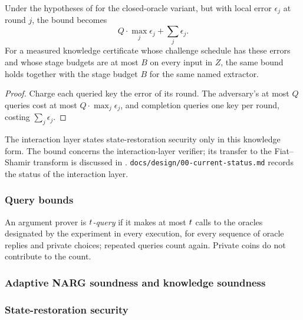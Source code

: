 \begin{theorem}
    \label{thm:sr_knowledge_soundness_nonuniform}
    Under the hypotheses of  for the closed-oracle variant, but
    with local error \(\epsilon_j\) at round \(j\), the bound becomes
    \begin{equation*}
        Q \cdot \max_j \epsilon_j + \sum_{j} \epsilon_j .
    \end{equation*}
    For a measured knowledge certificate whose challenge schedule has these errors and whose stage
    budgets are at most \(B\) on every input in \(Z\), the same bound holds together with the stage
    budget \(B\) for the same named extractor.
    \leanok
\end{theorem}
\begin{proof}
    \leanok
    Charge each queried key the error of its round. The adversary's at most \(Q\) queries cost at
    most \(Q \cdot \max_j \epsilon_j\), and completion queries one key per round, costing
    \(\sum_j \epsilon_j\).
\end{proof}

The interaction layer states state-restoration security only in this knowledge form. The bound concerns the
interaction-layer verifier; its transfer to the Fiat--Shamir transform is discussed in
. \texttt{docs/design/00-current-status.md} records the status of
the interaction layer.

\subsubsection{Query bounds}

\begin{definition}
  \label{def:counted_queries}
An argument prover is \emph{\(t\)-query} if it makes at most   \(t\) calls to the oracles designated by the experiment in every   execution, for every sequence of oracle replies and private choices; repeated   queries count again. Private coins do not contribute to the count.
  \leanok
\end{definition}

\subsubsection{Adaptive NARG soundness and knowledge soundness}



\subsubsection{State-restoration security}


